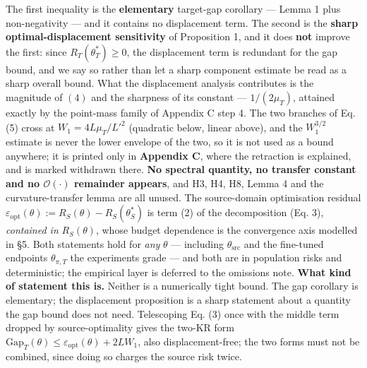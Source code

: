 \documentclass[pdflatex,sn-mathphys-ay]{sn-jnl}
\begin{document}
The first inequality is the \textbf{elementary} target-gap corollary --- Lemma 1 plus non-negativity --- and it contains no displacement term. The second is the \textbf{sharp optimal-displacement sensitivity} of Proposition 1, and it does \textbf{not} improve the first: since $R_T(\theta^*_T)\ge0$, the displacement term is redundant for the gap bound, and we say so rather than let a sharp component estimate be read as a sharp overall bound. What the displacement analysis contributes is the magnitude of $(4)$ and the sharpness of its constant --- $1/(2\mu_T)$, attained exactly by the point-mass family of Appendix C step 4. The two branches of Eq. (5) cross at $W_1=4L\mu_T/L'^2$ (quadratic below, linear above), and the $W_1^{3/2}$ estimate is never the lower envelope of the two, so it is not used as a bound anywhere; it is printed only in \textbf{Appendix C}, where the retraction is explained, and is marked withdrawn there. \textbf{No spectral quantity, no transfer constant and no $\mathcal{O}(\cdot)$ remainder appears}, and H3, H4, H8, Lemma 4 and the curvature-transfer lemma are all unused. The source-domain optimisation residual $\varepsilon_{\mathrm{opt}}(\theta) := R_S(\theta) - R_S(\theta^*_S)$ is term (2) of the decomposition (Eq. 3), \emph{contained in} $R_S(\theta)$, whose budget dependence is the convergence axis modelled in \S{}5. Both statements hold for \emph{any} \ensuremath{\theta} --- including $\theta_{\mathrm{src}}$ and the fine-tuned endpoints $\theta_{\pi,T}$ the experiments grade --- and both are in population risks and deterministic; the empirical layer is deferred to the omissions note. \textbf{What kind of statement this is.} Neither is a numerically tight bound. The gap corollary is elementary; the displacement proposition is a sharp statement about a quantity the gap bound does not need. Telescoping Eq. (3) once with the middle term dropped by source-optimality gives the two-KR form $\mathrm{Gap}_T(\theta)\le\varepsilon_{\mathrm{opt}}(\theta)+2LW_1$, also displacement-free; the two forms must not be combined, since doing so charges the source risk twice.
\end{document}
